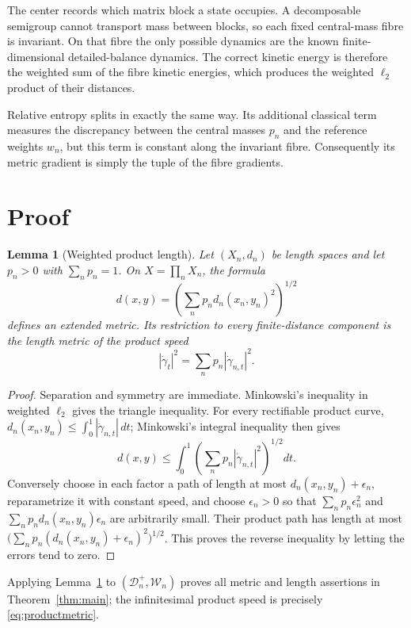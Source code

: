 \documentclass[11pt]{article}
\newtheorem{lemma}{Lemma}
\newcommand{\D}{\mathcal D}
\newcommand{\W}{\mathcal W}
\begin{document}
The center records which matrix block a state occupies.  A decomposable
semigroup cannot transport mass between blocks, so each fixed central-mass
fibre is invariant.  On that fibre the only possible dynamics are the known
finite-dimensional detailed-balance dynamics.  The correct kinetic energy is
therefore the weighted sum of the fibre kinetic energies, which produces the
weighted $\ell_2$ product of their distances.

Relative entropy splits in exactly the same way.  Its additional classical
term measures the discrepancy between the central masses $p_n$ and the
reference weights $w_n$, but this term is constant along the invariant fibre.
Consequently its metric gradient is simply the tuple of the fibre gradients.

\section{Proof}

\begin{lemma}[Weighted product length]\label{lem:length}
Let $(X_n,d_n)$ be length spaces and let $p_n>0$ with $\sum_np_n=1$.  On
$X=\prod_nX_n$, the formula
\[
 d(x,y)=\left(\sum_np_nd_n(x_n,y_n)^2\right)^{1/2}
\]
defines an extended metric.  Its restriction to every finite-distance
component is the length metric of the product speed
\[
 |\dot\gamma_t|^2=\sum_np_n|\dot\gamma_{n,t}|^2.
\]
\end{lemma}

\begin{proof}
Separation and symmetry are immediate.  Minkowski's inequality in weighted
$\ell_2$ gives the triangle inequality.  For every rectifiable product curve,
$d_n(x_n,y_n)\leq\int_0^1|\dot\gamma_{n,t}|\,dt$; Minkowski's integral
inequality then gives
\[
 d(x,y)\leq\int_0^1
 \left(\sum_np_n|\dot\gamma_{n,t}|^2\right)^{1/2}dt.
\]
Conversely choose in each factor a path of length at most
$d_n(x_n,y_n)+\epsilon_n$, reparametrize it with constant speed, and choose
$\epsilon_n>0$ so that
$\sum_np_n\epsilon_n^2$ and
$\sum_np_nd_n(x_n,y_n)\epsilon_n$ are arbitrarily small.  Their product path
has length at most
$\bigl(\sum_np_n(d_n(x_n,y_n)+\epsilon_n)^2\bigr)^{1/2}$.
This proves the reverse inequality by letting the errors tend to zero.
\end{proof}

Applying Lemma~\ref{lem:length} to $(\D_n^+,\W_n)$ proves all metric and
length assertions in Theorem~\ref{thm:main}; the infinitesimal product speed
is precisely \eqref{eq:productmetric}.
\end{document}
